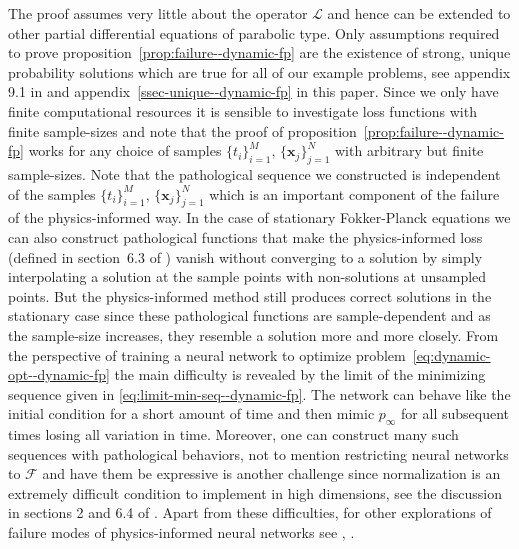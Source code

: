 The proof assumes very little about the operator $\mathcal L$ and hence can be extended to other partial differential equations of parabolic type. Only assumptions required to prove proposition~\ref{prop:failure--dynamic-fp} are the existence of strong, unique probability solutions which are true for all of our example problems, see appendix 9.1 in \cite{mandal2023learning} and appendix~\ref{ssec-unique--dynamic-fp} in this paper. Since we only have finite computational resources it is sensible to investigate loss functions with finite sample-sizes and note that the proof of proposition~\ref{prop:failure--dynamic-fp} works for any choice of samples $\{t_i\}_{i=1}^M,\,\{\mathbf x_j\}_{j=1}^N$ with arbitrary but finite sample-sizes. Note that the pathological sequence we constructed is independent of the samples $\{t_i\}_{i=1}^M,\,\{\mathbf x_j\}_{j=1}^N$ which is an important component of the failure of the physics-informed way. In the case of stationary Fokker-Planck equations we can also construct pathological functions that make the physics-informed loss (defined in section~6.3 of \cite{mandal2023learning}) vanish without converging to a solution by simply interpolating a solution at the sample points with non-solutions at unsampled points. But the physics-informed method still produces correct solutions in the stationary case since these pathological functions are sample-dependent and as the sample-size increases, they resemble a solution more and more closely. From the perspective of training a neural network to optimize problem~\ref{eq:dynamic-opt--dynamic-fp} the main difficulty is revealed by the limit of the minimizing sequence given in \eqref{eq:limit-min-seq--dynamic-fp}. The network can behave like the initial condition for a short amount of time and then mimic $p_\infty$ for all subsequent times losing all variation in time. Moreover, one can construct many such sequences with pathological behaviors, not to mention restricting neural networks to $\mathcal{F}$ and have them be expressive is another challenge since normalization is an extremely difficult condition to implement in high dimensions, see the discussion in sections 2 and 6.4 of \cite{mandal2023learning}. Apart from these difficulties, for other explorations of failure modes of physics-informed neural networks see \cite{krishnapriyan2021characterizing}, \cite{basir2022investigating}.